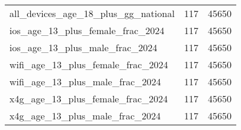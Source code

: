 \begin{table}[ht]
\begin{tabular}{lrr}
  all\_devices\_age\_18\_plus\_gg\_national & 117 & 45650 \\ 
  ios\_age\_13\_plus\_female\_frac\_2024 & 117 & 45650 \\ 
  ios\_age\_13\_plus\_male\_frac\_2024 & 117 & 45650 \\ 
  wifi\_age\_13\_plus\_female\_frac\_2024 & 117 & 45650 \\ 
  wifi\_age\_13\_plus\_male\_frac\_2024 & 117 & 45650 \\ 
  x4g\_age\_13\_plus\_female\_frac\_2024 & 117 & 45650 \\ 
  x4g\_age\_13\_plus\_male\_frac\_2024 & 117 & 45650 \\ 
   \hline
\end{tabular}
\end{table}

